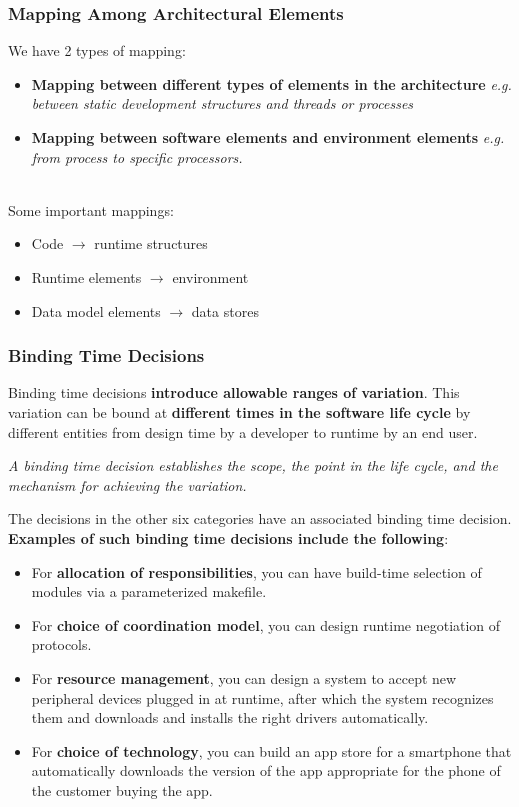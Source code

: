 \documentclass[a4paper]{article}
\begin{document}
\subsubsection{Mapping Among Architectural Elements}
We have 2 types of mapping:
\begin{itemize}
\item \textbf{Mapping between different types of elements in the architecture} 
\textit{e.g. between static development structures and threads or processes}
\item \textbf{Mapping between software elements and environment elements} 
\textit{e.g. from process to specific processors.}\\\\
\end{itemize}


Some important mappings: 
\begin{itemize}
\item Code $\rightarrow$ runtime structures
\item Runtime elements $\rightarrow$ environment
\item Data model elements $\rightarrow$ data stores
\end{itemize}

\subsubsection{Binding Time Decisions}
Binding time decisions \textbf{introduce allowable ranges of variation}. This variation can be bound at \textbf{different times in the software life cycle} by different entities from design time by a developer to runtime by an end user. 

\textit{A binding time decision establishes the scope, the point in the life cycle, and the mechanism for achieving the variation.}

The decisions in the other six categories have an associated binding time decision. \textbf{Examples of such binding time decisions include the following}:

\begin{itemize}
\item For \textbf{allocation of responsibilities}, you can have build-time selection of modules via a parameterized makefile.

\item For \textbf{choice of coordination model}, you can design runtime negotiation of protocols.

\item For \textbf{resource management}, you can design a system to accept new peripheral devices plugged in at runtime, after which the system recognizes them and downloads and installs the right drivers automatically.

\item For \textbf{choice of technology}, you can build an app store for a smartphone that automatically downloads the version of the app appropriate for the phone of the customer buying the app.\\
\end{itemize}
\end{document}
